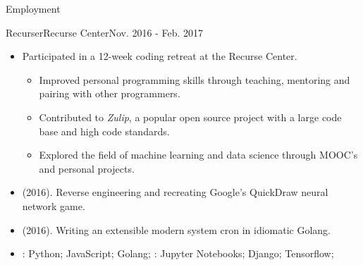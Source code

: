 \documentclass[]{mcdowellcv}
\begin{document}
    \makeheader

    \begin{cvsection}{Employment}

        \begin{cvsubsection}{Recurser}{Recurse Center}{Nov. 2016 - Feb. 2017}
            \begin{itemize}
                \item Participated in a 12-week coding retreat at the Recurse Center.
                \begin{itemize}
                    \item Improved personal programming skills through teaching, mentoring and pairing with other programmers.
                    \item Contributed to \textit{Zulip}, a popular open source project with a large code base and high code standards.
                    \item Explored the field of machine learning and data science through MOOC's and personal projects.
                \end{itemize}
            \end{itemize}
            \begin{itemize}
                \item {} (2016). Reverse engineering and recreating Google's QuickDraw neural network game.
                \item {} (2016). Writing an extensible modern system cron in idiomatic Golang.
            \end{itemize}
            \begin{itemize}
                 \item {}: Python; JavaScript; Golang; \newline
                : Jupyter Notebooks; Django; Tensorflow;
            \end{itemize}
        \end{cvsubsection}


\end{cvsection}
\end{document}

